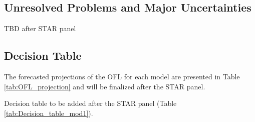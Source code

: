 \documentclass[12pt,]{article}
\begin{document}
\subsection*{Unresolved Problems and Major
Uncertainties}\label{unresolved-problems-and-major-uncertainties}

TBD after STAR panel

\FloatBarrier

\subsection*{Decision Table}\label{decision-table}

The forecasted projections of the OFL for each model are presented in
Table \ref{tab:OFL_projection} and will be finalized after the STAR
panel.

Decision table to be added after the STAR panel (Table
\ref{tab:Decision_table_mod1}).
\end{document}
